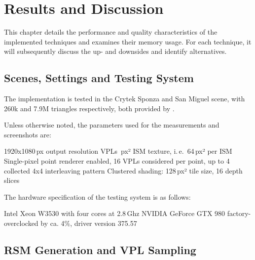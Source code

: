 

\chapter{Results and Discussion}
\label{chap:results}

This chapter details the performance and quality characteristics of the implemented techniques and  examines their memory usage. For each technique, it will subsequently discuss the up- and downsides and identify alternatives.

\section{Scenes, Settings and Testing System}
\label{sec:results:settings}

The implementation is tested in the Crytek Sponza and San Miguel scene, with 260k and 7.9M triangles respectively, both provided by \citet{McGuire2011Data}.


Unless otherwise noted, the parameters used for the measurements and screenshots are:
\begin{outline}
    \1 1920x1080\,px output resolution
     VPLs
    \,px² ISM texture, i.\,e.\ 64\,px² per ISM
    \1 Single-pixel point renderer enabled, 16 VPLs considered per point, up to 4 collected
    \1 4x4 interleaving pattern
    \1 Clustered shading: 128\,px² tile size, 16 depth slices
\end{outline}

\noindent
The hardware specification of the testing system is as follows:
\begin{outline}
    \1 Intel Xeon W3530 with four cores at 2.8\,Ghz
    \1 NVIDIA GeForce GTX 980 factory-overclocked by ca. 4\%, driver version 375.57
\end{outline}


\section{RSM Generation and VPL Sampling}
\label{sec:results:RsmAndVplSampling}

